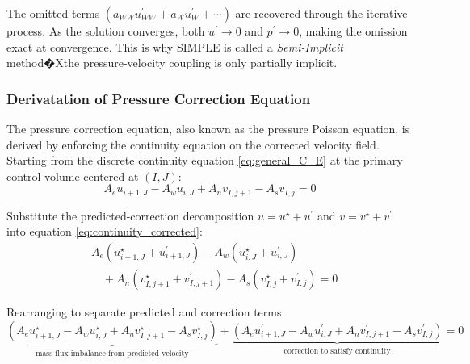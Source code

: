 \documentclass[12pt]{article}
\theoremstyle{plain}  %
\theoremstyle{definition}  %
\begin{document}
The omitted terms $(a_{WW}u_{WW}^{\prime} + a_{W}u_{W}^{\prime} + \cdots)$ are recovered through the iterative process. As the solution converges, both $u^{\prime} \to 0$ and $p^{\prime} \to 0$, making the omission exact at convergence. This is why SIMPLE is called a \textit{Semi-Implicit} method�Xthe pressure-velocity coupling is only partially implicit.

\subsubsection{Derivatation of Pressure Correction Equation}
\noindent The pressure correction equation, also known as the pressure Poisson equation, is derived by enforcing the continuity equation on the corrected velocity field. Starting from the discrete continuity equation \eqref{eq:general_C_E} at the primary control volume centered at $(I,J)$:
\begin{equation}\label{eq:continuity_corrected}
A_{e}u_{i+1,J} - A_{w}u_{i,J} + A_{n}v_{I,j+1} - A_{s}v_{I,j} = 0
\end{equation}



\noindent Substitute the predicted-correction decomposition $u = u^{\star} + u^{\prime}$ and $v = v^{\star} + v^{\prime}$ into equation \eqref{eq:continuity_corrected}:
\begin{equation}\label{eq:continuity_decomposed}
\begin{aligned}
&A_{e}(u_{i+1,J}^{\star} + u_{i+1,J}^{\prime}) - A_{w}(u_{i,J}^{\star} + u_{i,J}^{\prime})\\
&\quad + A_{n}(v_{I,j+1}^{\star} + v_{I,j+1}^{\prime}) - A_{s}(v_{I,j}^{\star} + v_{I,j}^{\prime}) = 0
\end{aligned}
\end{equation}

\noindent Rearranging to separate predicted and correction terms:
\begin{equation}\label{eq:continuity_separated}
\underbrace{(A_{e}u_{i+1,J}^{\star} - A_{w}u_{i,J}^{\star} + A_{n}v_{I,j+1}^{\star} - A_{s}v_{I,j}^{\star})}_{\text{mass flux imbalance from predicted velocity}} + \underbrace{(A_{e}u_{i+1,J}^{\prime} - A_{w}u_{i,J}^{\prime} + A_{n}v_{I,j+1}^{\prime} - A_{s}v_{I,j}^{\prime})}_{\text{correction to satisfy continuity}} = 0
\end{equation}
\end{document}
